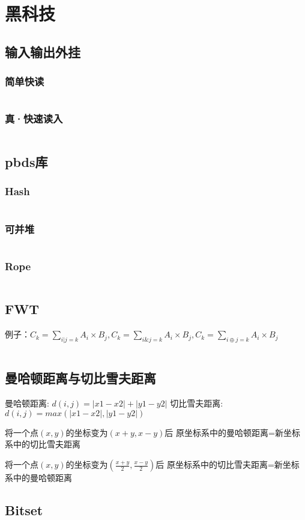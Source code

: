 \documentclass[a4paper,fleqn,11pt]{article}
\begin{document}
\section{黑科技}

\subsection{输入输出外挂}
\subsubsection{简单快读}
\inputminted[breaklines]{c++}{黑科技/QuickIO.cpp}
\subsubsection{真·快速读入}
\inputminted[breaklines]{c++}{黑科技/FastIO.cpp}

\subsection{pbds库}
\subsubsection{Hash}
\inputminted[breaklines]{c++}{黑科技/Hash.cpp}
\subsubsection{可并堆}
\inputminted[breaklines]{c++}{黑科技/Heap.cpp}
\subsubsection{Rope}
\inputminted[breaklines]{c++}{黑科技/Rope.cpp}

\subsection{FWT}
例子：$C_k=\sum_{i|j=k}A_i×B_j,C_k=\sum_{i\&j=k}A_i×B_j,C_k=\sum_{i\oplus j=k}A_i×B_j$
\inputminted[breaklines]{c++}{黑科技/Fwt.cpp}

\subsection{曼哈顿距离与切比雪夫距离}
曼哈顿距离: $d(i,j)=|x1-x2|+|y1-y2|$
切比雪夫距离: $d(i,j)=max(|x1-x2|,|y1-y2|)$

将一个点$(x,y)$的坐标变为$(x+y,x-y)$后
原坐标系中的曼哈顿距离=新坐标系中的切比雪夫距离

将一个点$(x,y)$的坐标变为$(\frac{x+y}{2},\frac{x-y}{2})$后
原坐标系中的切比雪夫距离=新坐标系中的曼哈顿距离

\subsection{Bitset}
\inputminted[breaklines]{c++}{黑科技/Bitset.cpp}

\end{document}
